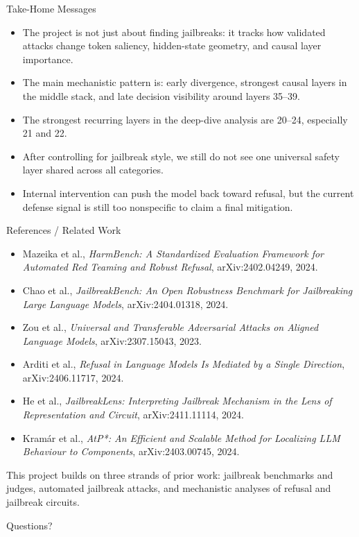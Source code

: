 \documentclass[aspectratio=169]{beamer}
\begin{document}
\begin{frame}{Take-Home Messages}
\small
\begin{itemize}
  \item The project is not just about finding jailbreaks: it tracks how validated attacks change token saliency, hidden-state geometry, and causal layer importance.
  \item The main mechanistic pattern is: early divergence, strongest causal layers in the middle stack, and late decision visibility around layers 35--39.
  \item The strongest recurring layers in the deep-dive analysis are 20--24, especially 21 and 22.
  \item After controlling for jailbreak style, we still do not see one universal safety layer shared across all categories.
  \item Internal intervention can push the model back toward refusal, but the current defense signal is still too nonspecific to claim a final mitigation.
\end{itemize}
\end{frame}

\begin{frame}{References / Related Work}
\tiny
\begin{itemize}
  \item Mazeika et al., \textit{HarmBench: A Standardized Evaluation Framework for Automated Red Teaming and Robust Refusal}, arXiv:2402.04249, 2024.
  \item Chao et al., \textit{JailbreakBench: An Open Robustness Benchmark for Jailbreaking Large Language Models}, arXiv:2404.01318, 2024.
  \item Zou et al., \textit{Universal and Transferable Adversarial Attacks on Aligned Language Models}, arXiv:2307.15043, 2023.
  \item Arditi et al., \textit{Refusal in Language Models Is Mediated by a Single Direction}, arXiv:2406.11717, 2024.
  \item He et al., \textit{JailbreakLens: Interpreting Jailbreak Mechanism in the Lens of Representation and Circuit}, arXiv:2411.11114, 2024.
  \item Kram\'ar et al., \textit{AtP*: An Efficient and Scalable Method for Localizing LLM Behaviour to Components}, arXiv:2403.00745, 2024.
\end{itemize}

\vspace{0.3em}
\scriptsize
This project builds on three strands of prior work: jailbreak benchmarks and judges, automated jailbreak attacks, and mechanistic analyses of refusal and jailbreak circuits.
\end{frame}

\begin{frame}
  \centering
  \Large Questions?
\end{frame}
\end{document}
